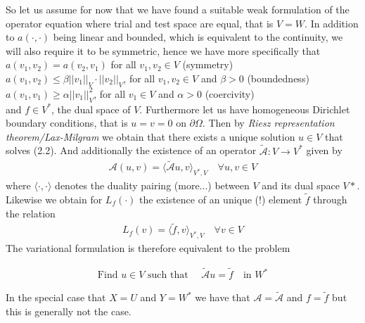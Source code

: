 \documentclass[../draft_1.tex]{subfiles}
\begin{document}
So let us assume for now that we have found a suitable weak formulation of the operator equation where trial and test space are equal, that is $V = W$. In addition to $a(\cdot, \cdot)$ being linear and bounded, which is equivalent to the continuity, we will also require it to be symmetric, hence we have more specifically that
\bigskip
\\
$a(v_1, v_2) = a(v_2, v_1)$ for all  $v_1, v_2 \in V$ (symmetry) \\
$a(v_1, v_2) \leq \beta ||v_1||_V \cdot ||v_2||_V $, for all $v_1, v_2 \in V$ and $\beta > 0$ (boundedness) \\ $a(v_1, v_1) \geq \alpha ||v_1||_V^2$, for all $v_1 \in V$ and $\alpha > 0$ (coercivity)
\bigskip
\\
and $f \in V^*$, the dual space of $V$. Furthermore let us have homogeneous Dirichlet boundary conditions, that is $u = v = 0$ on $\partial \Omega$. Then by \textit{Riesz representation theorem/Lax-Milgram} we obtain that there exists a unique solution $u \in V$ that solves (2.2). And additionally the existence of an operator $\tilde{\mathcal{A}} : V \rightarrow V^*$ given by
\begin{align}
\mathcal{A}(u,v) = \langle \tilde{\mathcal{A}} u, v \rangle_{V^*, V} \quad \forall u, v \in V
\end{align}
where $\langle \cdot, \cdot \rangle$ denotes the duality pairing (more...) between $V$ and its dual space $V*$. Likewise we obtain for $L_f(\cdot)$ the existence of an unique (!) element $\tilde{f}$ through the relation
\begin{align}
L_f(v) = \langle \tilde{f}, v \rangle_{V^*, V} \quad \forall v \in V
\end{align} 
The variational formulation is therefore equivalent to the problem 

\begin{align}
\text{Find } u \in V \text{ such that } \quad \tilde{\mathcal{A}} u = \tilde{f} \quad  \text{in } W^*
\end{align}

In the special case that $X = U$ and $Y = W^*$ we have that $ \mathcal{A} = \tilde{\mathcal{A}}$ and $ f = \tilde{f}$ but this is generally not the case. 
\end{document}
